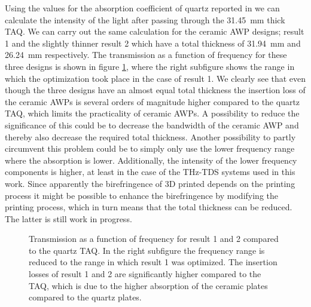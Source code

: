 Using the values for the absorption coefficient of quartz reported in \cite{DGrischkowsky1990} we can calculate the intensity of the light after passing through the \SI{31.45}{\milli \meter} thick TAQ. We can carry out the same calculation for the ceramic AWP designs; result 1 and the slightly thinner result 2 which have a total thickness of \SI{31.94}{\milli \meter} and \SI{26.24}{\milli \meter} respectively. The transmission as a function of frequency for these three designs is shown in figure \ref{fig:cl4_intensity}, where the right subfigure shows the range in which the optimization took place in the case of result 1. We clearly see that even though the three designs have an almost equal total thickness the insertion loss of the ceramic AWPs is several orders of magnitude higher compared to the quartz TAQ, which limits the practicality of ceramic AWPs.
A possibility to reduce the significance of this could be to decrease the bandwidth of the ceramic AWP and thereby also decrease the required total thickness. Another possibility to partly circumvent this problem could be to simply only use the lower frequency range where the absorption is lower. Additionally, the intensity of the lower frequency components is higher, at least in the case of the THz-TDS systems used in this work. Since apparently the birefringence of 3D printed  depends on the printing process it might be possible to enhance the birefringence by modifying the printing process, which in turn means that the total thickness can be reduced. The latter is still work in progress.

\begin{figure}[ht]
    \centering
    
    \caption{Transmission as a function of frequency for result 1 and 2 compared to the quartz TAQ. In the right subfigure the frequency range is reduced to the range in which result 1 was optimized. The insertion losses of result 1 and 2 are significantly higher compared to the TAQ, which is due to the higher absorption of the ceramic plates compared to the quartz plates.}
    \label{fig:cl4_intensity}
\end{figure}

\begin{figure}[ht]
    \centering
    
    \caption{}
    \label{fig:cl4_params}
\end{figure}

